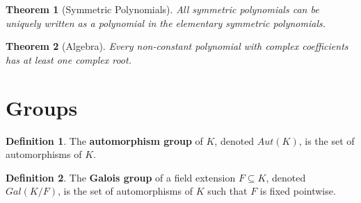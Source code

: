 \documentclass[
    parskip=half,
    toc=flat,
    toc=sectionentrydotfill,
]{scrartcl}  %
\theoremstyle{definition}
\newtheorem{definition}{Definition}[section]
\theoremstyle{plain}
\newtheorem{theorem}{Theorem}[section]
\theoremstyle{remark}
\begin{document}
\begin{theorem}[Symmetric Polynomials]
    All symmetric polynomials can be uniquely written as a polynomial in the
    elementary symmetric polynomials.
\end{theorem}

\begin{theorem}[Algebra]
    Every non-constant polynomial with complex coefficients has at least one
    complex root.
\end{theorem}


\section{Groups}


\begin{definition}
    The \textbf{automorphism group} of $K$, denoted $Aut(K)$, is the set of
    automorphisms of $K$.
\end{definition}

\begin{definition}
    The \textbf{Galois group} of a field extension $F\subseteq K$, denoted
    $Gal(K/F)$, is the set of automorphisms of $K$ such that $F$ is fixed
    pointwise.
\end{definition}
\end{document}
